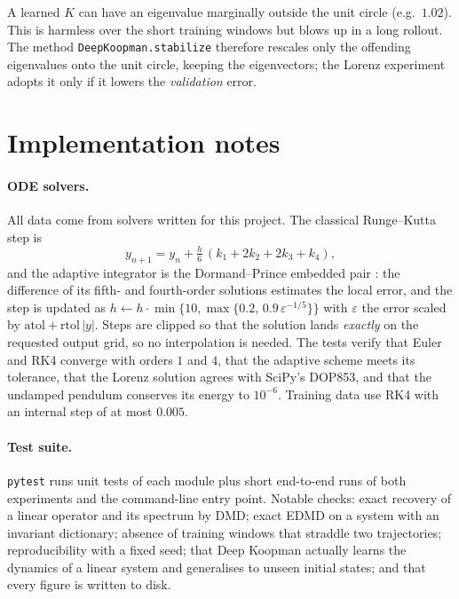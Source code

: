 \documentclass[11pt,a4paper]{article}
\newcommand{\code}[1]{\texttt{#1}}
\begin{document}
A learned $K$ can have an eigenvalue marginally outside the unit circle (e.g.\ $1.02$). This is harmless over the
short training windows but blows up in a long rollout. The method \code{DeepKoopman.stabilize} therefore rescales
only the offending eigenvalues onto the unit circle, keeping the eigenvectors; the Lorenz experiment adopts it only
if it lowers the \emph{validation} error.

\section{Implementation notes}
\paragraph{ODE solvers.}
All data come from solvers written for this project. The classical Runge--Kutta step is
\begin{equation}
  y_{n+1}=y_n+\tfrac h6\,(k_1+2k_2+2k_3+k_4),
\end{equation}
and the adaptive integrator is the Dormand--Prince embedded pair \cite{Dormand1980}: the difference of its fifth-
and fourth-order solutions estimates the local error, and the step is updated as
$h\leftarrow h\cdot\min\{10,\max\{0.2,\,0.9\,\varepsilon^{-1/5}\}\}$ with $\varepsilon$ the error scaled by
$\mathrm{atol}+\mathrm{rtol}\,|y|$. Steps are clipped so that the solution lands \emph{exactly} on the requested
output grid, so no interpolation is needed. The tests verify that Euler and RK4 converge with orders $1$ and $4$, that
the adaptive scheme meets its tolerance, that the Lorenz solution agrees with SciPy's DOP853, and that the undamped
pendulum conserves its energy to $10^{-6}$. Training data use RK4 with an internal step of at most $0.005$.

\paragraph{Test suite.}
\code{pytest} runs unit tests of each module plus short end-to-end runs of both experiments and the command-line
entry point. Notable checks: exact recovery of a linear operator and its spectrum by DMD; exact EDMD on a system
with an invariant dictionary; absence of training windows that straddle two trajectories; reproducibility with a
fixed seed; that Deep Koopman actually learns the dynamics of a linear system and generalises to unseen initial
states; and that every figure is written to disk.
\end{document}
